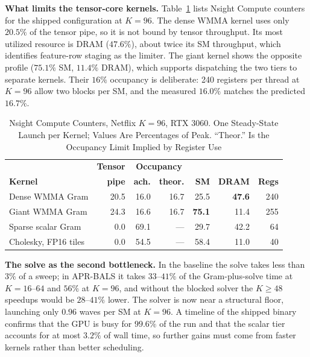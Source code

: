 \textbf{What limits the tensor-core kernels.} Table~\ref{tab:ncu} lists Nsight Compute counters for the shipped configuration at $K=96$. The dense WMMA kernel uses only $20.5\%$ of the tensor pipe, so it is not bound by tensor throughput. Its most utilized resource is DRAM ($47.6\%$), about twice its SM throughput, which identifies feature-row staging as the limiter. The giant kernel shows the opposite profile ($75.1\%$ SM, $11.4\%$ DRAM), which supports dispatching the two tiers to separate kernels. Their $16\%$ occupancy is deliberate: 240 registers per thread at $K=96$ allow two blocks per SM, and the measured $16.0\%$ matches the predicted $16.7\%$.

\begin{table}[!t]
\caption{Nsight Compute Counters, Netflix $K=96$, RTX 3060. One Steady-State Launch per Kernel; Values Are Percentages of Peak. ``Theor.'' Is the Occupancy Limit Implied by Register Use}
\label{tab:ncu}
\centering
\footnotesize
\renewcommand{\arraystretch}{1.05}
\setlength{\tabcolsep}{2.5pt}
\begin{tabular}{lrrrrrr}
\toprule
 & \textbf{Tensor} & \multicolumn{2}{c}{\textbf{Occupancy}} & & & \\
\textbf{Kernel} & \textbf{pipe} & \textbf{ach.} & \textbf{theor.} & \textbf{SM} & \textbf{DRAM} & \textbf{Regs} \\
\midrule
Dense WMMA Gram       & 20.5 & 16.0 & 16.7 & 25.5 & \textbf{47.6} & 240 \\
Giant WMMA Gram       & 24.3 & 16.6 & 16.7 & \textbf{75.1} & 11.4 & 255 \\
Sparse scalar Gram    & 0.0  & 69.1 & ---  & 29.7 & 42.2 & 64 \\
Cholesky, FP16 tiles  & 0.0  & 54.5 & ---  & 58.4 & 11.0 & 40 \\
\bottomrule
\end{tabular}
\end{table}

\textbf{The solve as the second bottleneck.} In the baseline the solve takes less than $3\%$ of a sweep; in APR-BALS it takes $33$--$41\%$ of the Gram-plus-solve time at $K=16$--$64$ and $56\%$ at $K=96$, and without the blocked solver the $K \ge 48$ speedups would be $28$--$41\%$ lower. The solver is now near a structural floor, launching only $0.96$ waves per SM at $K=96$. A timeline of the shipped binary confirms that the GPU is busy for $99.6\%$ of the run and that the scalar tier accounts for at most $3.2\%$ of wall time, so further gains must come from faster kernels rather than better scheduling.

